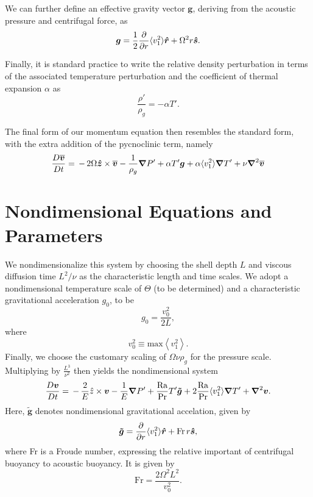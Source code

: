 We can further define an effective gravity vector $\boldsymbol{g}$, deriving from the acoustic pressure and centrifugal force, as
\begin{equation}
\boldsymbol{g} = \frac{1}{2}\frac{\partial}{\partial r}\langle v_1^2\rangle\boldsymbol{\hat{r}} + \Omega^2 r\boldsymbol{\boldsymbol{\hat{s}}}  .
\end{equation}

Finally, it is standard practice to write the relative density perturbation in terms of the associated temperature perturbation and the coefficient of thermal expansion $\alpha$ as
\begin{equation}
\label{eq:texp}
\frac{\rho'}{\rho_g}=-\alpha T'.
\end{equation}

The final form of our momentum equation then resembles the standard form, with the extra addition of the pycnoclinic term, namely
\begin{equation}
\frac{ D \vvecbar }{D t}   =  
\,-\, 2\Omega\boldsymbol{\hat{z}}\times\vvecbar 
-\frac{1}{\rho_g}\boldsymbol{\nabla}P'  %
						        +\alpha T'\boldsymbol{g}
							+\alpha \langle v_1^2\rangle\boldsymbol{\nabla}T'
+ \nu\boldsymbol{\nabla}^2\vvecbar
\end{equation}

\section{Nondimensional Equations and Parameters}
We nondimensionalize this system by choosing the shell depth $L$ and viscous diffusion time $L^2/\nu$ as the characteristic length and time scales.  We adopt a nondimensional temperature scale of $\Theta$ (to be determined) and a characteristic gravitational acceleration $g_0$, to be
\begin{equation}
g_0 = \frac{v_0^2}{2 L},
\end{equation}
where 
\begin{equation}
v_0^2 \equiv \mathrm{max}\left\langle v_1^2 \right\rangle.
\end{equation}
Finally, we choose the customary scaling of $\Omega\nu\rho_g$ for the pressure scale.  Multiplying by $\frac{L^3}{\nu^2}$ then yields the nondimensional system
\begin{equation}
\label{eq:nondim}
\frac{ D \vvec }{Dt}   = 
\,-\, \frac{2}{E}{\hat{z}}\times\vvec  
-\frac{1}{E}\boldsymbol{\nabla}P'  %
						        + \frac{\mathrm{Ra}}{\mathrm{Pr}} T' \boldsymbol{\tilde{g}}
							+2\frac{\mathrm{Ra}}{\mathrm{Pr}}\langle v_1^2\rangle\boldsymbol{\nabla} T'
+ \boldsymbol{\nabla}^2\vvec.
\end{equation}
Here, $\boldsymbol{\tilde{g}}$ denotes nondimensional gravitational accelation, given by
\begin{equation}
\boldsymbol{\tilde{g}} = \frac{\partial}{\partial r}\langle v_1^2\rangle\boldsymbol{\hat{r}} + \mathrm{Fr}\, r\boldsymbol{\boldsymbol{\hat{s}}},
\end{equation}
where Fr is a Froude number, expressing the relative important of centrifugal buoyancy to acoustic buoyancy.  It is given by
\begin{equation}
\mathrm{Fr} = \frac{2\Omega^2 L^2}{v_0^2}.
\end{equation}

